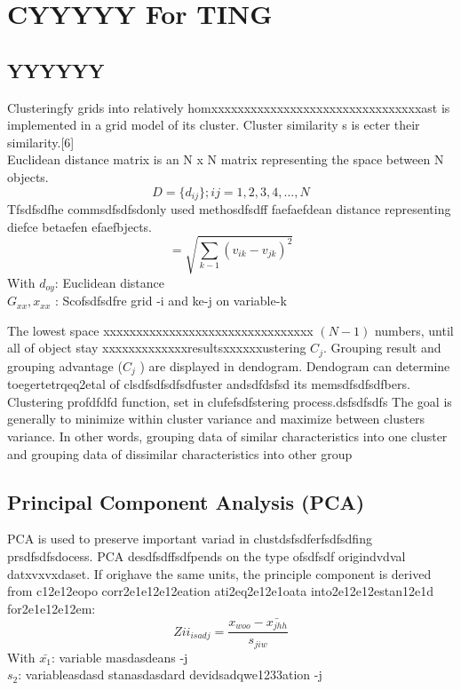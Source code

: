 \documentclass[conference]{IEEEtran}
\begin{document}
{%

\section{CYYYYY For TING}
\subsection{YYYYYY}
Clusteringfy grids into relatively homxxxxxxxxxxxxxxxxxxxxxxxxxxxxxxxxast is implemented in a grid model of its cluster. Cluster similarity s is ecter their similarity.[6] 
\\Euclidean distance matrix is an N x N matrix representing the space between N objects.
\begin{equation}\label{eq:3}
    D=\{d_{ij}\}; ij=1,2,3,4,\dots,N
\end{equation}
Tfsdfsdfhe commsdfsdfsdonly used methosdfsdff faefaefdean distance representing diefce betaefen efaefbjects.
\begin{equation} \label{eq:4}
    =\sqrt{\sum_{k-1}(v_{ik}-v_{jk})^2}
\end{equation}
With 
$d_{oy}$\hspace*{8mm}: Euclidean distance\\
\hspace*{7.5mm}  $G_{xx},x_{xx} $        : Scofsdfsdfre grid -i and ke-j on variable-k

The lowest space xxxxxxxxxxxxxxxxxxxxxxxxxxxxxxxx $(N-1)$ numbers, until all of object stay xxxxxxxxxxxxxresultsxxxxxxustering $C_{j}$. Grouping result and grouping advantage ($C_{j}$ ) are displayed in dendogram. Dendogram can determine toegertetrqeq2etal of clsdfsdfsdfsdfuster andsdfdsfsd its memsdfsdfsdfbers. Clustering profdfdfd function, set in clufefsdfstering process.dsfsdfsdfs The goal is generally to minimize within cluster variance and maximize between clusters variance. In other words, grouping data of similar characteristics into one cluster and grouping data of dissimilar characteristics into other group
\subsection{Principal Component Analysis (PCA)}
PCA is used to preserve important variad in clustdsfsdferfsdfsdfing prsdfsdfsdocess. PCA desdfsdffsdfpends on the type ofsdfsdf origindvdval datxvxvxdaset. If orighave the same units, the principle component is derived from c12e12eopo corr2e1e12e12eation ati2eq2e12e1oata into2e12e12estan12e1d for2e1e12e12em:  
\begin{equation} \label{eq:5}
   Zii_{isadj} = \frac{x_{woo}-\bar{x_{jhh}}}{s_{jiw}}
\end{equation}
With $\bar{x_{1}}$:  variable masdasdeans -j \\
\hspace*{7.5mm}  $s_{2}$:  variableasdasd stanasdasdard devidsadqwe1233ation -j

}
\end{document}
